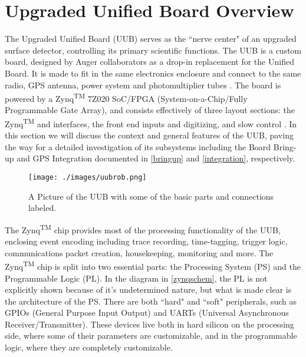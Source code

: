 \section{Upgraded Unified Board Overview}
\label{boardview}
The Upgraded Unified Board (UUB) serves as the ``nerve center" of an upgraded surface detector, controlling its primary scientific functions. The UUB is a custom board, designed by Auger collaborators as a drop-in replacement for the Unified Board. It is made to fit in the same electronics enclosure and connect to the same radio, GPS antenna, power system and photomultiplier tubes \cite{primepdr}. The board is powered by a Zynq\textsuperscript{TM} 7Z020 SoC/FPGA (System-on-a-Chip/Fully Programmable Gate Array), and consists effectively of three layout sections: the Zynq\textsuperscript{TM} and interfaces, the front end inputs and digitizing, and slow control \cite{zynq}. In this section we will discuss the context and general features of the UUB, paving the way for a detailed investigation of its subsystems including the Board Bring-up and GPS Integration documented in \autoref{bringup} and \autoref{integration}, respectively.

\begin{figure}[H]
\begin{center}
\texttt{[image: ./images/uubrob.png]}
\caption[UUB Picture]{A Picture of the UUB with some of the basic parts and connections labeled.}
\label{uubpic}
\end{center}
\end{figure}

The Zynq\textsuperscript{TM} chip provides most of the processing functionality of the UUB, enclosing event encoding including trace recording, time-tagging, trigger logic, communications packet creation, housekeeping, monitoring and more. The Zynq\textsuperscript{TM} chip is split into two essential parts: the Processing System (PS) and the Programmable Logic (PL). In the diagram in \autoref{zynqschem}, the PL is not explicitly shown because of it's undetermined nature, but what is made clear is the architecture of the PS. There are both ``hard" and ``soft" peripherals, such as GPIOs (General Purpose Input Output) and UARTs (Universal Asynchronous Receiver/Transmitter). These devices live both in hard silicon on the processing side, where some of their parameters are customizable, and in the programmable logic, where they are completely customizable.

